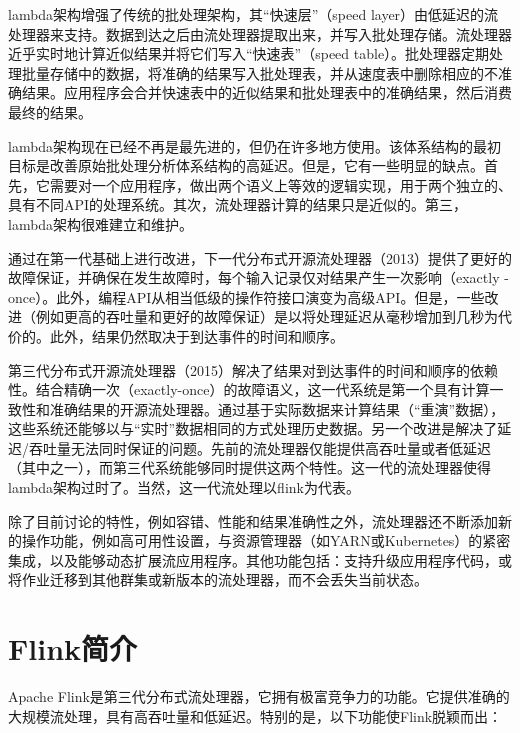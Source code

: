 \documentclass[cn,11pt,chinese]{elegantbook}
\begin{document}
lambda架构增强了传统的批处理架构，其``快速层''（speed
layer）由低延迟的流处理器来支持。数据到达之后由流处理器提取出来，并写入批处理存储。流处理器近乎实时地计算近似结果并将它们写入``快速表''（speed
table）。批处理器定期处理批量存储中的数据，将准确的结果写入批处理表，并从速度表中删除相应的不准确结果。应用程序会合并快速表中的近似结果和批处理表中的准确结果，然后消费最终的结果。

lambda架构现在已经不再是最先进的，但仍在许多地方使用。该体系结构的最初目标是改善原始批处理分析体系结构的高延迟。但是，它有一些明显的缺点。首先，它需要对一个应用程序，做出两个语义上等效的逻辑实现，用于两个独立的、具有不同API的处理系统。其次，流处理器计算的结果只是近似的。第三，lambda架构很难建立和维护。

通过在第一代基础上进行改进，下一代分布式开源流处理器（2013）提供了更好的故障保证，并确保在发生故障时，每个输入记录仅对结果产生一次影响（exactly
-once）。此外，编程API从相当低级的操作符接口演变为高级API。但是，一些改进（例如更高的吞吐量和更好的故障保证）是以将处理延迟从毫秒增加到几秒为代价的。此外，结果仍然取决于到达事件的时间和顺序。

第三代分布式开源流处理器（2015）解决了结果对到达事件的时间和顺序的依赖性。结合精确一次（exactly-once）的故障语义，这一代系统是第一个具有计算一致性和准确结果的开源流处理器。通过基于实际数据来计算结果（``重演''数据），这些系统还能够以与``实时''数据相同的方式处理历史数据。另一个改进是解决了延迟/吞吐量无法同时保证的问题。先前的流处理器仅能提供高吞吐量或者低延迟（其中之一），而第三代系统能够同时提供这两个特性。这一代的流处理器使得lambda架构过时了。当然，这一代流处理以flink为代表。

除了目前讨论的特性，例如容错、性能和结果准确性之外，流处理器还不断添加新的操作功能，例如高可用性设置，与资源管理器（如YARN或Kubernetes）的紧密集成，以及能够动态扩展流应用程序。其他功能包括：支持升级应用程序代码，或将作业迁移到其他群集或新版本的流处理器，而不会丢失当前状态。

\hypertarget{flinkux7b80ux4ecb}{%
\section{Flink简介}\label{flinkux7b80ux4ecb}}

Apache
Flink是第三代分布式流处理器，它拥有极富竞争力的功能。它提供准确的大规模流处理，具有高吞吐量和低延迟。特别的是，以下功能使Flink脱颖而出：
\end{document}
